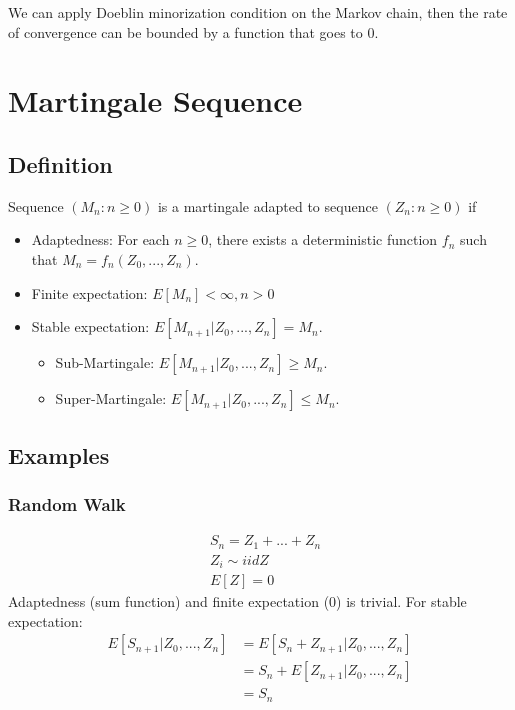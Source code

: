 We can apply Doeblin minorization condition on the Markov chain, then the rate of convergence can be bounded by a function that goes to 0. 



\section{Martingale Sequence} 

\subsection{Definition}
Sequence $(M_n: n \geq 0)$ is a martingale adapted to sequence $(Z_n: n \geq 0)$ if
    \begin{itemize}
        \item Adaptedness: For each $n\geq 0$, there exists a deterministic function $f_n$ such that $M_n = f_n(Z_0, ..., Z_n)$.
        \item Finite expectation: $E[M_n] < \infty , n > 0$ 
        \item Stable expectation: $E[M_{n+1}|Z_0, ..., Z_n] = M_n$.
            \begin{itemize}
                \item Sub-Martingale: $E[M_{n+1}|Z_0, ..., Z_n] \geq M_n$.
                \item Super-Martingale: $E[M_{n+1}|Z_0, ..., Z_n] \leq M_n$.
            \end{itemize}
    \end{itemize}

\subsection{Examples} 
\subsubsection{Random Walk} 
    \begin{align*}
        & S_n = Z_1 + ... + Z_n \\
        & Z_i \sim iid Z\\
        & E[Z] = 0
    \end{align*}
Adaptedness (sum function) and finite expectation (0) is trivial. For stable expectation: 
    \begin{align*}
        E[S_{n+1}| Z_0, ..., Z_n] 
        & = E[S_n + Z_{n+1} | Z_0, ..., Z_n] \\
        & = S_n + E[Z_{n+1} | Z_0, ..., Z_n]\\
        & = S_n 
    \end{align*}

